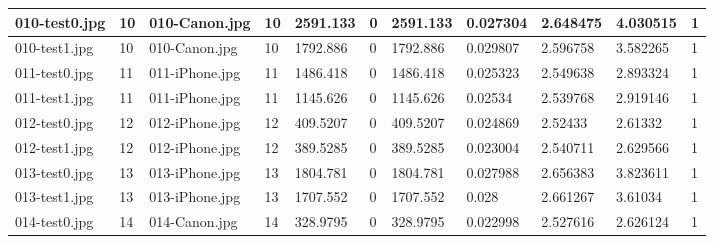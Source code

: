 \begin{landscape}
\begin{longtable}{|p{2cm}|p{1cm}|p{2cm}|p{1cm}|p{2cm}|p{1cm}|p{2cm}|p{2cm}|p{2cm}|p{2cm}|p{1cm}|}
		010-test0.jpg   & 10               & 010-Canon.jpg         & 10                          & 2591.133              & 0                       & 2591.133                   & 0.027304              & 2.648475              & 4.030515                 & 1                \\ \hline
		010-test1.jpg   & 10               & 010-Canon.jpg         & 10                          & 1792.886              & 0                       & 1792.886                   & 0.029807              & 2.596758              & 3.582265                 & 1                \\ \hline
		011-test0.jpg   & 11               & 011-iPhone.jpg        & 11                          & 1486.418              & 0                       & 1486.418                   & 0.025323              & 2.549638              & 2.893324                 & 1                \\ \hline
		011-test1.jpg   & 11               & 011-iPhone.jpg        & 11                          & 1145.626              & 0                       & 1145.626                   & 0.02534               & 2.539768              & 2.919146                 & 1                \\ \hline
		012-test0.jpg   & 12               & 012-iPhone.jpg        & 12                          & 409.5207              & 0                       & 409.5207                   & 0.024869              & 2.52433               & 2.61332                  & 1                \\ \hline
		012-test1.jpg   & 12               & 012-iPhone.jpg        & 12                          & 389.5285              & 0                       & 389.5285                   & 0.023004              & 2.540711              & 2.629566                 & 1                \\ \hline
		013-test0.jpg   & 13               & 013-iPhone.jpg        & 13                          & 1804.781              & 0                       & 1804.781                   & 0.027988              & 2.656383              & 3.823611                 & 1                \\ \hline
		013-test1.jpg   & 13               & 013-iPhone.jpg        & 13                          & 1707.552              & 0                       & 1707.552                   & 0.028                 & 2.661267              & 3.61034                  & 1                \\ \hline
		014-test0.jpg   & 14               & 014-Canon.jpg         & 14                          & 328.9795              & 0                       & 328.9795                   & 0.022998              & 2.527616              & 2.626124                 & 1                \\ \hline

\end{longtable}
\end{landscape}
